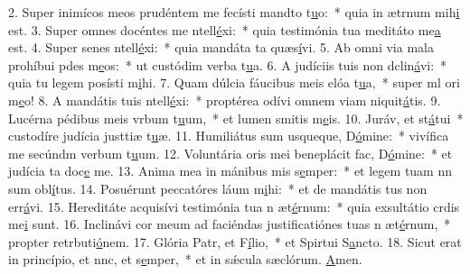 2. Super inimícos meos prudéntem me fecísti mandto t\uline{u}o:~* quia in ætrnum mih\uline{i} est.
3. Super omnes docéntes me ntell\uline{é}xi:~* quia testimónia tua meditáto me\uline{a} est.
4. Super senes ntell\uline{é}xi:~* quia mandáta ta quæs\uline{í}vi.
5. Ab omni via mala prohíbui pdes m\uline{e}os:~* ut custódim verba t\uline{u}a.
6. A judíciis tuis non dclin\uline{á}vi:~* quia tu legem posísti m\uline{i}hi.
7. Quam dúlcia fáucibus meis elóa t\uline{u}a,~* super ml ori m\uline{e}o!
8. A mandátis tuis ntell\uline{é}xi:~* proptérea odívi omnem viam niquit\uline{á}tis.
9. Lucérna pédibus meis vrbum t\uline{u}um,~* et lumen smitis m\uline{e}is.
10. Juráv, et st\uline{á}tui~* custodíre judícia justtiæ t\uline{u}æ.
11. Humiliátus sum usqueque, D\uline{ó}mine:~* vivífica me secúndm verbum t\uline{u}um.
12. Voluntária oris mei beneplácit fac, D\uline{ó}mine:~* et judícia ta doc\uline{e} me.
13. Anima mea in mánibus mis s\uline{e}mper:~* et legem tuam nn sum obl\uline{í}tus.
14. Posuérunt peccatóres láum m\uline{i}hi:~* et de mandátis tus non err\uline{á}vi.
15. Hereditáte acquisívi testimónia tua n æt\uline{é}rnum:~* quia exsultátio crdis me\uline{i} sunt.
16. Inclinávi cor meum ad faciéndas justificatiónes tuas n æt\uline{é}rnum,~* propter retrbuti\uline{ó}nem.
17. Glória Patr, et F\uline{í}lio,~* et Spirtui S\uline{a}ncto.
18. Sicut erat in princípio, et nnc, et s\uline{e}mper,~* et in sǽcula sæclórum. \uline{A}men.
